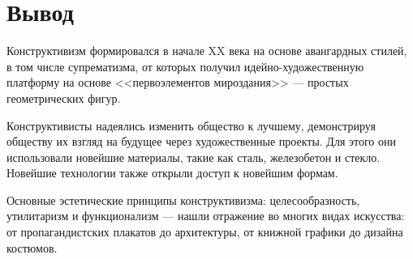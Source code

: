 \chapter*{Вывод}
Конструктивизм формировался в начале XX века на основе
авангардных стилей, в том числе супрематизма, от которых получил
идейно-художественную платформу на основе <<первоэлементов мироздания>> --- простых геометрических фигур.

Конструктивисты надеялись изменить общество к лучшему,
демонстрируя обществу их взгляд на будущее через художественные проекты.
Для этого они использовали новейшие материалы, такие как сталь, железобетон и стекло.
Новейшие технологии также открыли доступ к новейшим формам.

Основные эстетические принципы конструктивизма: целесообразность, утилитаризм и функционализм ---
нашли отражение во многих видах искусства: от пропагандистских плакатов до архитектуры, от книжной графики до дизайна костюмов.